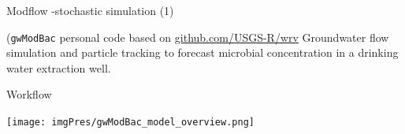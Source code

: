\documentclass[8pt,ignorenonframetext,]{beamer}
\newcommand{\columnsbegin}{\begin{columns}}
\begin{document}
\begin{frame}[fragile]{Modflow -stochastic simulation (1)}

(\texttt{gwModBac} personal code based on
\href{https://github.com/USGS-R/wrv}{github.com/USGS-R/wrv} Groundwater
flow simulation and particle tracking to forecast microbial
concentration in a drinking water extraction well.

\begin{block}{Workflow}

\texttt{[image: imgPres/gwModBac\_model\_overview.png]}

\end{block}

\end{frame}

\end{document}
